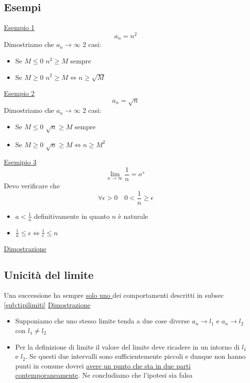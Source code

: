 \subsection{Esempi}
\underline{Esempio 1}
\[
a_n = n^2
\] 
Dimostriamo che $a_n \to \infty$
2 casi:
\begin{itemize}
	\item Se $M \le 0 $ \rarr $ n^2 \ge M$ sempre
	\item Se $M \ge 0 $ \rarr $n^2 \ge M \Leftrightarrow n \ge \sqrt{M} $
\end{itemize}
\underline{Esempio 2}
\[
a_n = \sqrt{n} 
\] 
Dimostriamo che $a_n \to \infty$ 2 casi:
\begin{itemize}
	\item Se $M \le 0 $ \rarr $\sqrt{n} \ge M$ sempre
	\item Se $M \ge 0$ \rarr $\sqrt{n} \ge M \Leftrightarrow n \ge M^2$
\end{itemize}
\bigbox{
\[
\lim_{n \to \infty} n ^{a} = \infty \quad \forall a\ge 0 
\]
}
\underline{Esemipio 3}
\[
\lim_{n \to \infty} \frac{1}{n} = o^{+} 
\] 
Devo verificare che \[
\forall \epsilon > 0 \quad 0 < \frac{1}{n} \ge \epsilon
\] 
\begin{itemize}
	\item $a < \frac{1}{n}$ definitivamente in quanto $n$ è naturale
	\item $\frac{1}{n} \le \epsilon \Leftrightarrow \frac{1}{\epsilon} \le n$
\end{itemize}
\bigbox{
\[
\lim_{n \to \infty}  n ^{\alpha} =0 \quad \forall \alpha \le 0
\] 
}

\underline{Dimostrazione}

\subsection{Unicità del limite}
Una successione ha sempre \underline{solo uno } dei comportamenti descritti in subsec \ref{sub:tipilimiti}
\underline{Dimostrazione}

\begin{itemize}
	\item Supponiamo che uno stesso limite tenda a due cose diverse $a_n \to l_1$ e $a_n \to l_2$ con $l_1 \neq l_2$
	\item Per la definizione di limite il valore del limite deve ricadere in un intorno di $l_1$ e $ l_2$. Se questi due intervalli sono sufficientemente piccoli e dunque non hanno punti in comune dovrei \underline{avere un punto che sta in due parti contemporaneamente}. Ne concludiamo che l'ipotesi sia falsa
\end{itemize}
